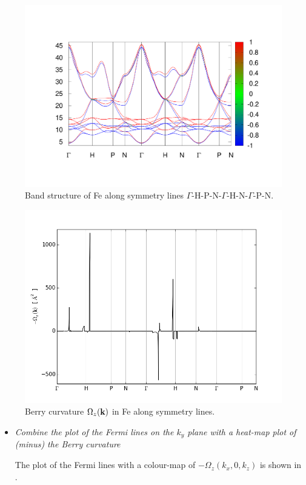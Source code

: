 \begin{figure}[b!]
\centering
\includegraphics[width=0.8\columnwidth,trim={50pt 80pt 50pt 80pt},clip]{figure/example18/Fe_bandstructure.pdf}
\caption{Band structure of Fe along symmetry lines $\Gamma$-H-P-N-$\Gamma$-H-N-$\Gamma$-P-N.}
\label{fig18.1}
\end{figure}
\clearpage

\begin{figure}[t!]
\centering
\includegraphics[width=0.7\columnwidth]{figure/example18/Fe_Berry_phase.png}
\caption{Berry curvature $\Omega_z(\bfk)$ in Fe along symmetry lines.}\label{fig18.2}
\end{figure}

\begin{itemize}
	\item {\it Combine the plot of the Fermi lines on the $k_y$ plane with a heat-map plot of (minus) the Berry curvature}

	The plot of the Fermi lines with a colour-map of $-\Omega_z(k_x,0,k_z)$ is shown in .
\end{itemize}

